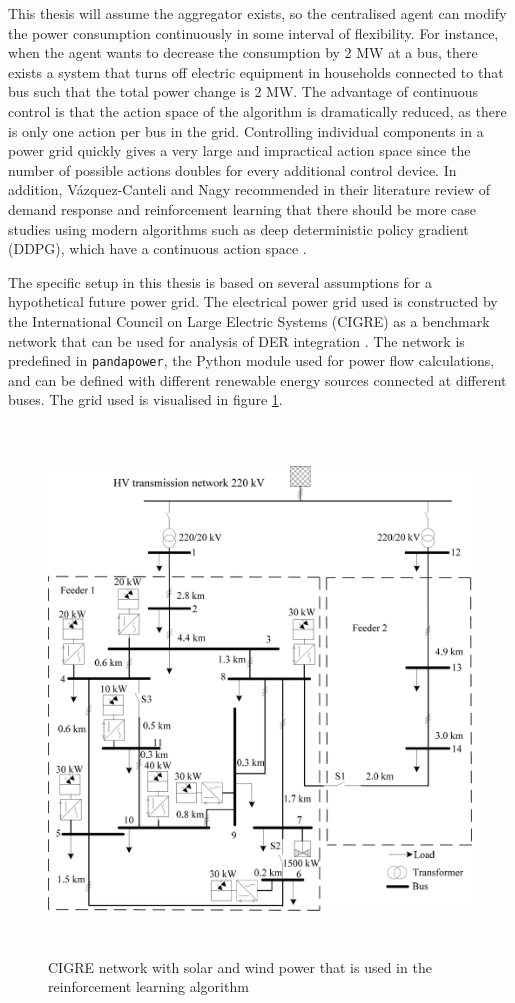 \documentclass[class=book, crop=false, 11pt]{standalone}
\begin{document}
This thesis will assume the aggregator exists, so the centralised agent can modify the power consumption continuously in some interval of flexibility. For instance, when the agent wants to decrease the consumption by 2 MW at a bus, there exists a system that turns off electric equipment in households connected to that bus such that the total power change is 2 MW.  The advantage of continuous control is that the action space of the algorithm is dramatically reduced, as there is only one action per bus in the grid. Controlling individual components in a power grid quickly gives a very large and impractical action space since the number of possible actions doubles for every additional control device. In addition, Vázquez-Canteli and Nagy recommended in their literature review of demand response and reinforcement learning that there should be more case studies using modern algorithms such as deep deterministic policy gradient (DDPG), which have a continuous action space \cite{vazquez2019reinforcement}.


The specific setup in this thesis is based on several assumptions for a hypothetical future power grid. The electrical power grid used is constructed by the International Council on Large Electric Systems (CIGRE) as a benchmark network that can be used for analysis of DER integration \cite{cigre}. The network is predefined in \texttt{pandapower}, the Python module used for power flow calculations, and can be defined with different renewable energy sources connected at different buses. The grid used is visualised in figure \ref{fig:problem:cigre_network}. 

\begin{figure}[ht]
    \center
    \includegraphics[height=14cm, width=13.5cm]{figures/cigre_network_mv_der.png}
    \caption  {CIGRE network with solar and wind power that is used in the reinforcement learning algorithm \cite{cigre}}
    \label{fig:problem:cigre_network}
\end{figure}
\end{document}
